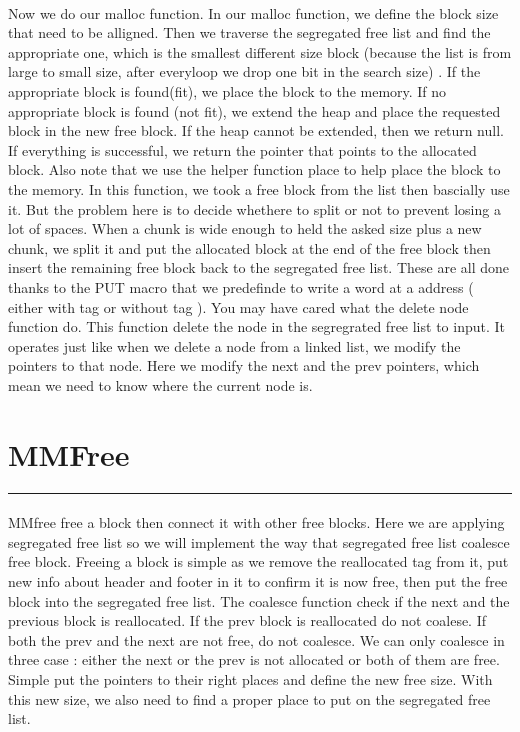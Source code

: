 \documentclass[a4paper]{article}
\begin{document}
\paragraph{} 
Now we do our malloc function. In our malloc function, we define the block size that need to be alligned. Then we traverse the segregated free list and find the appropriate one, which is the smallest different size block (because the list is from large to small size, after everyloop we drop one bit in the search size) . If the appropriate  block is found(fit), we place the block to the memory. If no appropriate block is found (not fit), we extend the heap and place the requested block in the new free block. If the heap cannot be extended, then we return null. If everything is successful, we return the pointer that points to the allocated block. Also note that we use the helper function place to help place the block to the memory. In this function, we took a free block from the list then bascially use it. But the problem here is to decide whethere to split or not to prevent losing a lot of spaces.  When a chunk is wide enough to held the asked size plus a new chunk, we split it and put the allocated block at the end of the free block then insert the remaining free block back to the segregated free list. These are all done thanks to the PUT macro that  we predefinde to write a word at a address ( either with tag or without tag ). You may have cared what the delete node function do. This function delete the node in the segregrated free list to input.  It operates just like when we delete a node from a linked list, we modify the pointers to that node. Here we modify the next and the prev pointers, which mean we need to know where the current node is.


 

 
\section{MMFree}
\noindent\rule{2cm}{0.4pt}
\paragraph{} 
MMfree free a block then connect it with other free blocks. Here we are applying segregated free list so we will implement the way that segregated free list coalesce  free block. Freeing a block is simple as we remove the reallocated tag from it, put new info about header and footer in it to confirm it is now free, then put the free block into the segregated free list. The coalesce function check if the next and the previous block is reallocated. If the prev block is reallocated do not coalese. If both the prev and the next are not free, do not coalesce. We can only coalesce in three case : either the next or the prev is not allocated or both of them are free. Simple put the pointers to their right places and define the new free size. With this new size, we also need to find a proper place to put on the segregated free list.  
\end{document}
